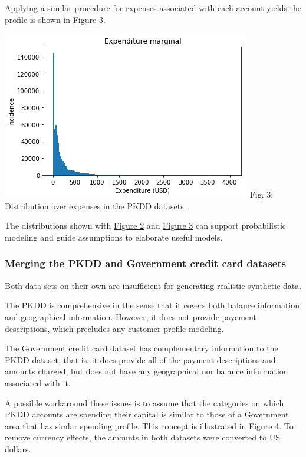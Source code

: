 \documentclass[]{article}
\begin{document}
Applying a similar procedure for expenses associated with each account
yields the profile is shown in
\protect\hyperlink{fig-expend-dist}{Figure 3}.

\includegraphics{uploads/upload_cf82f71d41931e913e0484d1f2821767.png}
Fig. 3: Distribution over expenses in the PKDD datasets.



The distributions shown with \protect\hyperlink{fig-income-dist}{Figure
2} and \protect\hyperlink{fig-expend-dist}{Figure 3} can support
probabilistic modeling and guide assumptions to elaborate useful models.

\subsubsection{Merging the PKDD and Government credit card
datasets}\label{merging-the-pkdd-and-government-credit-card-datasets}

Both data sets on their own are insufficient for generating realistic
synthetic data.

The PKDD is comprehensive in the sense that it covers both balance
information and geographical information. However, it does not provide
payement descriptions, which precludes any customer profile modeling.

The Government credit card dataset has complementary information to the
PKDD dataset, that is, it does provide all of the payment descriptions
and amounts charged, but does not have any geographical nor balance
information associated with it.

A possible workaround these issues is to assume that the categories on
which PKDD accounts are spending their capital is similar to those of a
Government area that has simlar spending profile. This concept is
illustrated in \href{fig-matching-profiles}{Figure 4}. To remove
currency effects, the amounts in both datasets were converted to US
dollars.
\end{document}
